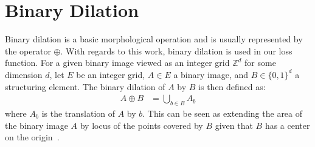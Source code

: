 

\section{Binary Dilation}\label{section:background-dilation}
Binary dilation is a basic morphological operation and is usually represented by the operator $\oplus$.
With regards to this work, binary dilation is used in our loss function.
For a given binary image viewed as an integer grid $\mathbb{Z}^d$ for some dimension $d$, let $E$ be an integer grid, $A \in E$ a binary image, and $B \in \{0,1\}^d$ a structuring element.
The binary dilation of $A$ by $B$ is then defined as:
\begin{align}
	A \oplus B &= \bigcup_{b \in B}A_b
\end{align}
where $A_b$ is the translation of $A$ by $b$.
This can be seen as extending the area of the binary image $A$ by locus of the points covered by $B$ given that $B$ has a center on the origin~\cite{morphology}.